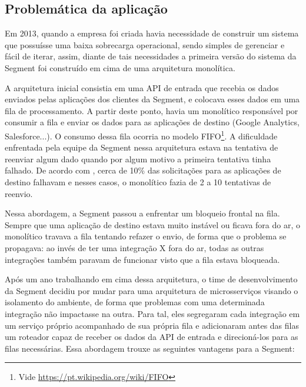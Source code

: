 \subsection{Problemática da aplicação}

Em 2013, quando a empresa foi criada havia necessidade de construir um sistema que possuísse uma
baixa sobrecarga operacional, sendo simples de gerenciar e fácil de iterar, assim, diante de tais
necessidades a primeira versão do sistema da Segment foi construído em cima de uma arquitetura monolítica.

A arquitetura inicial consistia em uma \gls{API} de entrada que recebia os dados enviados pelas aplicações dos
clientes da Segment, e colocava esses dados em uma fila de processamento. A partir deste ponto,
havia um monolítico responsável por consumir a fila e enviar os dados para as aplicações de destino
(Google Analytics, Salesforce...). O consumo dessa fila ocorria no modelo \gls{FIFO}\footnote{Vide
\url{https://pt.wikipedia.org/wiki/FIFO}}. A dificuldade enfrentada pela equipe da Segment nessa
arquitetura estava na tentativa de reenviar algum dado quando por algum motivo a primeira tentativa
tinha falhado. De acordo com , cerca de 10\% das
solicitações para as aplicações de destino falhavam e nesses casos, o monolítico fazia de 2 a 10
tentativas de reenvio.

Nessa abordagem, a Segment passou a enfrentar um bloqueio frontal na fila. Sempre que uma aplicação
de destino estava muito instável ou ficava fora do ar, o monolítico travava a fila tentando refazer
o envio, de forma que o problema se propagava: ao invés de ter uma integração X fora do ar, todas as
outras integrações também paravam de funcionar visto que a fila estava bloqueada.

Após um ano trabalhando em cima dessa arquitetura, o time de desenvolvimento da Segment decidiu por
mudar para uma arquitetura de microsserviços visando o isolamento do ambiente, de forma que
problemas com uma determinada integração não impactasse na outra. Para tal, eles segregaram cada
integração em um serviço próprio acompanhado de sua própria fila e adicionaram antes das filas um
roteador capaz de receber os dados da \gls{API} de entrada e direcioná-los para as filas necessárias.
Essa abordagem trouxe as seguintes vantagens para a Segment:

